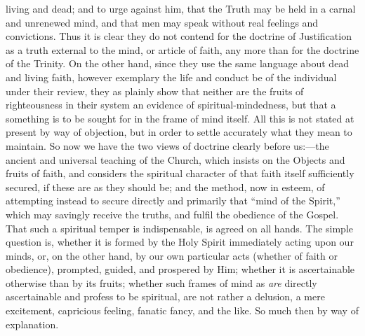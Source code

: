 living and dead; and to urge against him, that the Truth may be held in
a carnal and unrenewed mind, and that men may speak without real
feelings and convictions. Thus it is clear they do not contend for the
doctrine of Justification as a truth external to the mind, or article of
faith, any more than for the doctrine of the Trinity. On the other hand,
since they use the same language about dead and living faith, however
exemplary the life and conduct be of the individual under their review,
they as plainly show that neither are the fruits of righteousness in
their system an evidence of spiritual-mindedness, but that a something
is to be sought for in the frame of mind itself. All this is not stated
at present by way of objection, but in order to settle accurately what
they mean to maintain. So now we have the two views of doctrine clearly
before us:—the ancient and universal teaching of the Church, which
insists on the Objects and fruits of faith, and considers the spiritual
character of that faith itself sufficiently secured, if these are as
they should be; and the method, now in esteem, of attempting instead to
secure directly and primarily that ``mind of the Spirit,'' which
may savingly receive the truths, and fulfil the obedience of the Gospel.
That such a spiritual temper is indispensable, is agreed on all hands.
The simple question is, whether it is formed by the Holy Spirit
immediately acting upon our minds, or, on the other hand, by our own
particular acts (whether of faith or obedience), prompted, guided, and
prospered by Him; whether it is ascertainable otherwise than by its
fruits; whether such frames of mind as \emph{are} directly ascertainable
and profess to be spiritual, are not rather a delusion, a mere
excitement, capricious feeling, fanatic fancy, and the like. So much
then by way of explanation.

